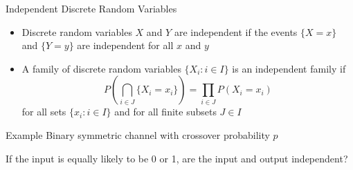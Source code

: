 \documentclass[t]{beamer}
\begin{document}
\begin{frame}{Independent Discrete Random Variables}
  \footnotesize
  \begin{itemize}
    \item \pause Discrete random variables $X$ and $Y$ are independent if the events $\{X = x\}$ and $\{Y = y\}$ are independent for all $x$ and $y$
    \item \pause A family of discrete random variables $\{X_i : i \in I\}$ is an independent family if
      \begin{equation*}
        P\left( \bigcap_{i \in J} \{X_i = x_i\} \right) = \prod_{i \in J} P(X_i = x_i)
      \end{equation*}
    for all sets $\{x_i : i \in I\}$ and for all finite subsets $J \in I$
  \end{itemize}
  \pause
  \begin{block}{Example}
    Binary symmetric channel with crossover probability $p$
    \begin{figure}
    \end{figure}
    \pause If the input is equally likely to be 0 or 1, are the input and output independent?
  \end{block}
  \normalsize
\end{frame}
\end{document}
